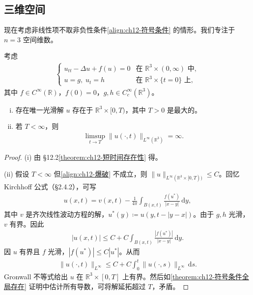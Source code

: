 \documentclass[../../main.tex]{subfiles}
\begin{document}
\subsection{三维空间}\label{subsection:ch12-三维空间}

现在考虑非线性项不取非负性条件\eqref{align:ch12-符号条件} 的情形。我们专注于 $n=3$ 空间维数。

\begin{theorem}\label{theorem:ch12-三维短时间爆破}考虑
\begin{align}
\begin{cases}
u_{tt}-\Delta u+f(u)=0 & \text{在 } \mathbb{R}^3\times(0,\infty) \text{ 中},\\
u=g,\;u_t=h & \text{在 } \mathbb{R}^3\times\{t=0\} \text{ 上},
\end{cases}
\label{align:ch12-三维初值}
\end{align}
其中 $f\in C^\infty(\mathbb{R})$，$f(0)=0$，$g,h\in C_c^\infty(\mathbb{R}^3)$。
\begin{enumerate}[(i)]
\item 存在唯一光滑解 $u$ 存在于 $\mathbb{R}^3\times[0,T)$，其中 $T>0$ 是最大的。
\item 若 $T<\infty$，则
\begin{align}
\limsup_{t\to T}\|u(\cdot,t)\|_{L^\infty(\mathbb{R}^3)}=\infty.
\label{align:ch12-爆破}
\end{align}
\end{enumerate}
\end{theorem}

\begin{proof}
(i) 由 \S12.2\cref{theorem:ch12-短时间存在性} 得。

(ii) 假设 $T<\infty$ 但\eqref{align:ch12-爆破} 不成立，则 $\|u\|_{L^\infty(\mathbb{R}^3\times[0,T))}\leqslant C$。回忆 Kirchhoff 公式（\S2.4.2），可写
\begin{align}
u(x,t)=v(x,t)-\frac{1}{4\pi}\int_{B(x,t)}\frac{f(u^*)}{|x-y|}\,\mathrm{d}y,
\label{align:ch12-Kirchhoff}
\end{align}
其中 $v$ 是齐次线性波动方程的解，$u^*(y)\coloneqq u(y,t-|y-x|)$。由于 $g,h$ 光滑，$v$ 有界。因此
\begin{align*}
|u(x,t)|\leqslant C+C\int_{B(x,t)}\frac{|f(u^*)|}{|x-y|}\,\mathrm{d}y.
\end{align*}
因 $u$ 有界且 $f$ 光滑，$|f(u^*)|\leqslant C|u^*|$。从而
\begin{align*}
\|u(\cdot,t)\|_{L^\infty}\leqslant C+C\int_0^t\|u(\cdot,s)\|_{L^\infty}\,\mathrm{d}s.
\end{align*}
Gronwall 不等式给出 $u$ 在 $\mathbb{R}^3\times[0,T]$ 上有界。然后如\cref{theorem:ch12-符号条件全局存在} 证明中估计所有导数，可将解延拓超过 $T$，矛盾。
\end{proof}
\end{document}
